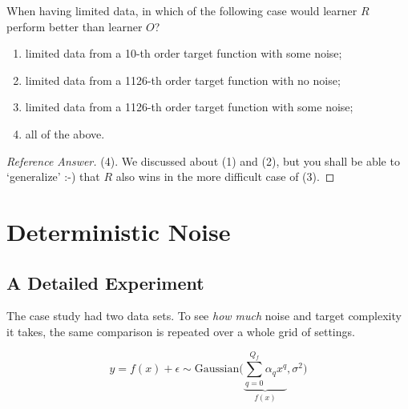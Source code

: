 \begin{exercise}
    When having limited data, in which of the following case would learner
    \(R\) perform better than learner \(O\)?
    \begin{enumerate}[(1)]
        \item limited data from a 10-th order target function with some noise;
        \item limited data from a 1126-th order target function with no noise;
        \item limited data from a 1126-th order target function with some
            noise;
        \item all of the above.
    \end{enumerate}
\end{exercise}

\begin{proof}[Reference Answer]
    (4). We discussed about (1) and (2), but you shall be able to `generalize'
    :-) that \(R\) also wins in the more difficult case of (3).
\end{proof}

\section{Deterministic Noise}\label{sec:det-noise}


\subsection{A Detailed Experiment}\label{sec:detailed-experiment}

The case study had two data sets. To see \emph{how much} noise and target
complexity it takes, the same comparison is repeated over a whole grid of
settings.

\begin{center}
    \begin{minipage}[c]{0.5\textwidth}
        \[
            y = f(x) + \epsilon \sim \text{Gaussian} \Biggl(
            \underbrace{\sum_{q=0}^{Q_f} \alpha_q x^q}_{f(x)}, \sigma^2
            \Biggr)
        \]
    \end{minipage}%
    \begin{minipage}[c]{0.45\textwidth}
        \centering
    \end{minipage}
\end{center}

